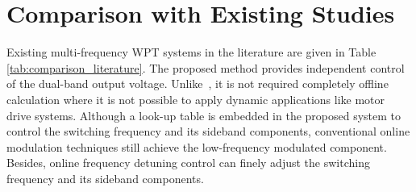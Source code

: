 \documentclass[journal]{IEEEtran}
\begin{document}
\vspace*{-4mm}
\section{Comparison with Existing Studies}
Existing multi-frequency WPT systems in the literature are given in Table \ref{tab:comparison_literature}.
The proposed method provides independent control of the dual-band output voltage.
Unlike~\cite{programmablePWM}, it is not  required completely offline calculation where it is not possible to apply dynamic applications like motor drive systems. Although a look-up table is embedded in the proposed system to control the switching frequency and its sideband components, conventional online modulation techniques still achieve the low-frequency modulated component. 
Besides, online frequency detuning control can finely adjust the switching frequency and its sideband components.
\end{document}
